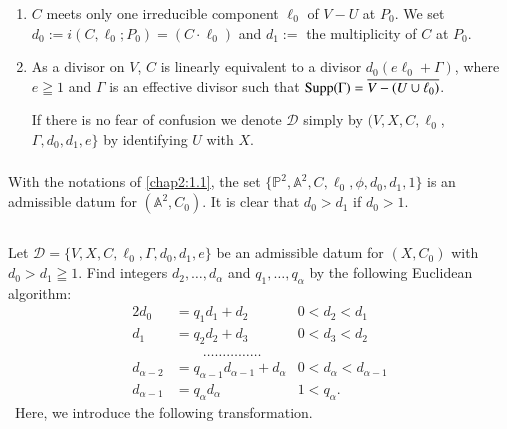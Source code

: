 \begin{defi*}
\begin{enumerate}
  \item $C$ meets only one irreducible component $\ell_{0}$ of $V-U$ at
    $P_{0}$. We set $d_{0}:=i(C,\ell_{0};P_{0})=(C\cdot \ell_{0})$ and
    $d_{1}:=$ the multiplicity of $C$ at $P_{0}$.
    
  \item As a divisor on $V$, $C$ is linearly equivalent to a divisor
    $d_{0}(e\ell_{0}+\Gamma)$, where $e\geqq 1$ and $\Gamma$ is an
    effective divisor such that $\operatorname{Supp}(\Gamma)=\overline{V-(U\cup
      \ell_{0})}$.
    
    If there is no fear of confusion we denote $\mathscr{D}$ simply by
    $(V,X,C,\ell_{0}$, $\Gamma,d_{0},d_{1},e\}$ by identifying $U$ with $X$.
  \end{enumerate}
\end{defi*}

\subsubsection{}\label{chap2:1.2.2}
\begin{example*}
With the notations of \ref{chap2:1.1}, the set
$\{\mathbb{P}^{2},\mathbb{A}^{2},C,\ell_{0},\phi,d_{0},d_{1},1\}$ is
an admissible datum for $(\mathbb{A}^{2},C_{0})$. It is clear that
$d_{0}>d_{1}$ if $d_{0}>1$.
\end{example*}

\subsection{}\label{chap2:1.3}
Let $\mathscr{D}=\{V,X,C,\ell_{0},\Gamma,d_{0},d_{1},e\}$ be an
admissible datum for $(X,C_{0})$ with $d_{0}>d_{1}\geqq 1$. Find
integers $d_{2},\ldots,d_{\alpha}$ and $q_{1},\ldots,q_{\alpha}$ by
the following Euclidean algorithm:
\begin{alignat*}{2}
d_{0} &= q_{1}d_{1}+d_{2} & 0<d_{2}<d_{1}\\
d_{1} &= q_{2}d_{2}+d_{3} & 0<d_{3}<d_{2}\\
      &\qquad \ldots\ldots\ldots\ldots\ldots & \phantom{a}\\
d_{\alpha-2} &= q_{\alpha-1}d_{\alpha-1}+d_{\alpha} &
0<d_{\alpha}<d_{\alpha-1}\\
d_{\alpha-1} &= q_{\alpha}d_{\alpha} & 1<q_{\alpha}.
\end{alignat*}\pageoriginale\
Here, we introduce the following transformation.

